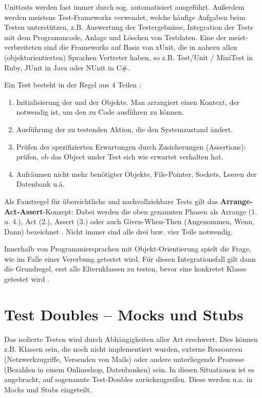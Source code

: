 Unittests werden fast immer durch sog.  automatisiert ausgeführt. Außerdem werden meistens Test-Frameworks verwendet, welche häufige Aufgaben beim Testen unterstützen, z.B. Auswertung der Testergebnisse, Integration der Tests mit dem Programmcode, Anlage und Löschen von Testdaten.  Eine der meist-verbreiteten sind die Frameworks auf Basis von xUnit, die in nahezu allen (objektorientierten) Sprachen Vertreter haben, so z.B. Test/Unit / MiniTest in Ruby, JUnit in Java oder NUnit in C\#.

Ein Test besteht in der Regel aus 4 Teilen \citep{rappin_rails_2011} \citep[Karte 46]{langr_agile_2011}:
\begin{enumerate}
 \item Initialisierung der  und der Objekte. Man arrangiert einen Kontext, der notwendig ist, um den zu Code ausführen zu können.
 \item Ausführung der zu testenden Aktion, die den Systemzustand ändert.
 \item Prüfen der spezifizierten Erwartungen durch Zusicherungen (Assertions): prüfen, ob das Object under Test sich wie erwartet verhalten hat.
 \item Aufräumen nicht mehr benötigter Objekte, File-Pointer, Sockets, Leeren der Datenbank u.ä.
\end{enumerate}
Als Faustregel für übersichtliche und nachvollziehbare Tests gilt das \textbf{Arrange-Act-Assert}-Konzept: Dabei werden die oben genannten Phasen als Arrange (1. u. 4.), Act (2.), Assert (3.) oder auch Given-When-Then (Angenommen, Wenn, Dann) bezeichnet \citep[Karte 46]{langr_agile_2011}. Nicht immer sind alle drei bzw. vier Teile notwendig.

Innerhalb von Programmiersprachen mit Objekt-Orientierung spielt die Frage, wie im Falle einer Vererbung getestet wird. Für diesen Integrationsfall gilt dann die Grundregel, erst alle Elternklassen zu testen, bevor eine konkretet Klasse getestet wird \citep{fritzsche_sqm_2005}.

 \section{Test Doubles -- Mocks und Stubs}
  \label{sec:mocks}
  Das isolierte Testen wird durch Abhängigkeiten aller Art erschwert. Dies können z.B. Klassen sein, die noch nicht implementiert wurden, externe Ressourcen (Netzwerkzugriffe, Versenden von Mails) oder andere unterliegende Prozesse (Bezahlen in einem Onlineshop, Datenbanken) sein. In diesen Situationen ist es angebracht, auf sogenannte Test-Doubles zurückzugreifen. Diese werden u.a. in Mocks und Stubs eingeteilt.

